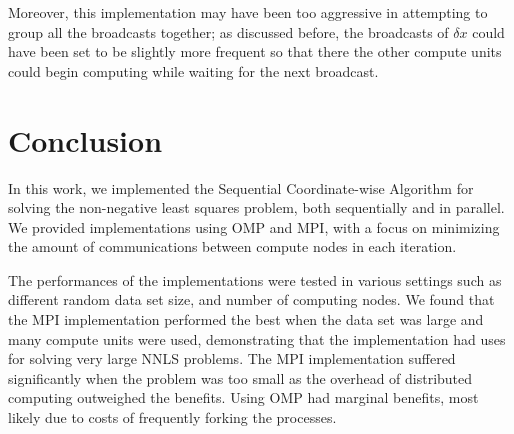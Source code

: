 \documentclass{article}
\begin{document}
Moreover, this implementation may have been too aggressive in attempting to group all the broadcasts together; as discussed before, the broadcasts of $\delta x$ could have been set to be slightly more frequent so that there the other compute units could begin computing while waiting for the next broadcast.

\section*{Conclusion}

In this work, we implemented the Sequential Coordinate-wise Algorithm for solving the non-negative least squares problem, both sequentially and in parallel. We provided implementations using OMP and MPI, with a focus on minimizing the amount of communications between compute nodes in each iteration.

The performances of the implementations were tested in various settings such as different random data set size, and number of computing nodes. We found that the MPI implementation performed the best when the data set was large and many compute units were used, demonstrating that the implementation had uses for solving very large NNLS problems. The MPI implementation suffered significantly when the problem was too small as the overhead of distributed computing outweighed the benefits. Using OMP had marginal benefits, most likely due to costs of frequently forking the processes.












\end{document}
